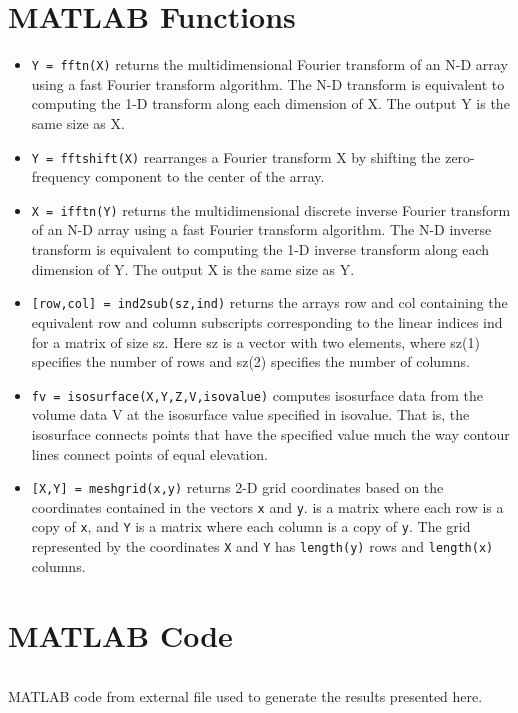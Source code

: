 \documentclass{article}
\begin{document}
\begin{appendices}

\section{MATLAB Functions}
\begin{itemize}
    \item \texttt{Y = fftn(X)} returns the multidimensional Fourier transform of an N-D array using a fast Fourier transform algorithm. The N-D transform is equivalent to computing the 1-D transform along each dimension of X. The output Y is the same size as X.
    \item \texttt{Y = fftshift(X)} rearranges a Fourier transform X by shifting the zero-frequency component to the center of the array.
    \item \texttt{X = ifftn(Y)} returns the multidimensional discrete inverse Fourier transform of an N-D array using a fast Fourier transform algorithm. The N-D inverse transform is equivalent to computing the 1-D inverse transform along each dimension of Y. The output X is the same size as Y.
    \item \texttt{[row,col] = ind2sub(sz,ind)} returns the arrays row and col containing the equivalent row and column subscripts corresponding to the linear indices ind for a matrix of size sz. Here sz is a vector with two elements, where sz(1) specifies the number of rows and sz(2) specifies the number of columns.
    \item \texttt{fv = isosurface(X,Y,Z,V,isovalue)} computes isosurface data from the volume data V at the isosurface value specified in isovalue. That is, the isosurface connects points that have the specified value much the way contour lines connect points of equal elevation.
    \item \texttt{[X,Y] = meshgrid(x,y)} returns 2-D grid coordinates based on the coordinates contained in the vectors \texttt{x} and \texttt{y}.  is a matrix where each row is a copy of \texttt{x}, and \texttt{Y} is a matrix where each column is a copy of \texttt{y}. The grid represented by the coordinates \texttt{X} and \texttt{Y} has \texttt{length(y)} rows and \texttt{length(x)} columns. 
\label{itemize:functions}
\end{itemize}

\section{MATLAB Code}
\begin{listing}[h]
\inputminted{matlab}{HW1_DanielBurnham.m}
\caption{MATLAB code from external file used to generate the results presented here.}
\label{listing:HW1code}
\end{listing}

\end{appendices}
\end{document}

